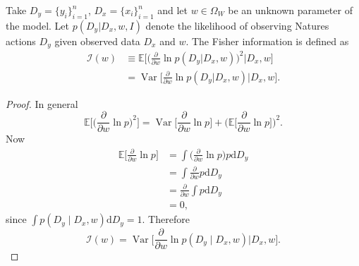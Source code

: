 \begin{definition}
	\label{def:fisher_information}
	Take $D_y= \{y_i\}_{i=1}^n$, $D_x= \{x_i\}_{i=1}^n$ and let $w \in \Omega_W$ be an unknown parameter of the model. Let $p(D_y | D_x, w, I)$ denote the likelihood of observing Natures actions $D_y$ given observed data $D_x$ and $w$. The Fisher information is defined as
	\begin{equation}
		\begin{split}
			\mathcal{I}(w) &\equiv \mathbb{E} \bigg[\bigg(\frac{\partial}{\partial w} \ln p(D_y|D_x, w)\bigg)^2 \Bigg| D_x, w\bigg]\\
			&= \operatorname{Var}\bigg[\frac{\partial}{\partial w} \ln p(D_y|D_x, w) \Bigg| D_x, w\bigg].
		\end{split}
	\end{equation}
\end{definition}

\begin{proof}
	In general
	\begin{equation}
		\mathbb{E}\bigg[\bigg(\frac{\partial}{\partial w} \ln p\bigg)^2\bigg] 
		= \operatorname{Var}\bigg[\frac{\partial}{\partial w} \ln p\bigg] + 
		\bigg(\mathbb{E}\bigg[\frac{\partial}{\partial w} \ln p\bigg]\bigg)^2.
	\end{equation}
	Now
	\begin{align}
		\mathbb{E}\bigg[\frac{\partial}{\partial w} \ln p\bigg] 
		&= \int \bigg(\frac{\partial}{\partial w} \ln p\bigg)  p \mathrm{d}D_y \\
		&= \int \frac{\partial}{\partial w} p \mathrm{d}D_y\\
		&= \frac{\partial}{\partial w} \int  p \mathrm{d}D_y \\
		&= 0,
	\end{align}
	since $\int p(D_y \mid D_x, w) \mathrm{d}D_y = 1$. Therefore
	\begin{equation}
		\mathcal{I}(w) = \operatorname{Var}\bigg[\frac{\partial}{\partial w} \ln p(D_y \mid D_x, w) \bigg| D_x, w\bigg].
	\end{equation}
\end{proof}

